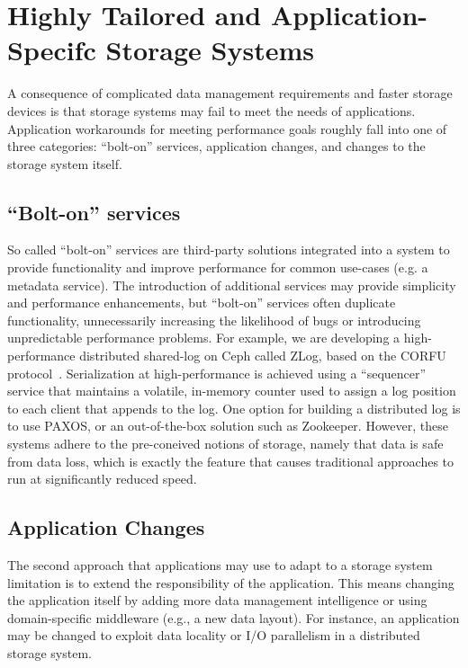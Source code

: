 \documentclass[10pt,twocolumn]{article}
\begin{document}
\section{Highly Tailored and Application-Specifc Storage
Systems}\label{highly-tailored-and-application-specifc-storage-systems}

\label{problem}

A consequence of complicated data management requirements and faster storage
devices is that storage systems may fail to meet the needs of applications.
Application workarounds for meeting performance goals roughly fall into one of
three categories: ``bolt-on'' services, application changes, and changes to
the storage system itself.

\subsection{\texorpdfstring{``Bolt-on''
services}{Bolt-on services}}\label{bolt-on-services}

So called ``bolt-on'' services are third-party solutions integrated into a
system to provide functionality and improve performance for common use-cases
(e.g. a metadata service). The introduction of additional services may provide
simplicity and performance enhancements, but ``bolt-on'' services often
duplicate functionality, unnecessarily increasing the likelihood of bugs or
introducing unpredictable performance problems. For example, we are developing
a high-performance distributed shared-log on Ceph called ZLog, based on the
CORFU protocol~\cite{corfu}. Serialization at high-performance is achieved using a
``sequencer'' service that maintains a volatile, in-memory counter used to assign a log
position to each client that appends to the log. One option for building
a distributed log is to use PAXOS, or an out-of-the-box solution such as
Zookeeper. However, these systems adhere to the pre-coneived notions of
storage, namely that data is safe from data loss, which is exactly the feature
that causes traditional approaches to run at significantly reduced speed.

\subsection{Application Changes}\label{application-changes}

The second approach that applications may use to adapt to a storage system
limitation is to
extend the responsibility of the application. This means changing the
application itself by adding more data management intelligence or
using domain-specific middleware (e.g., a new data layout). For instance, an
application may be changed to exploit data locality or I/O
parallelism in a distributed storage system.
\end{document}
